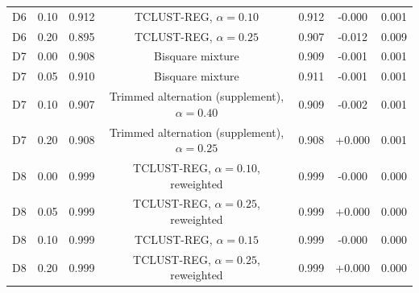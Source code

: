 \begin{table}[htbp]
\begin{tabular}{llcclcc}
D6 & 0.10 & 0.912 & TCLUST-REG, $\alpha=0.10$ & 0.912 & -0.000 & 0.001 \\
D6 & 0.20 & 0.895 & TCLUST-REG, $\alpha=0.25$ & 0.907 & -0.012 & 0.009 \\
D7 & 0.00 & 0.908 & Bisquare mixture & 0.909 & -0.001 & 0.001 \\
D7 & 0.05 & 0.910 & Bisquare mixture & 0.911 & -0.001 & 0.001 \\
D7 & 0.10 & 0.907 & Trimmed alternation (supplement), $\alpha=0.40$ & 0.909 & -0.002 & 0.001 \\
D7 & 0.20 & 0.908 & Trimmed alternation (supplement), $\alpha=0.25$ & 0.908 & +0.000 & 0.001 \\
D8 & 0.00 & 0.999 & TCLUST-REG, $\alpha=0.10$, reweighted & 0.999 & -0.000 & 0.000 \\
D8 & 0.05 & 0.999 & TCLUST-REG, $\alpha=0.25$, reweighted & 0.999 & +0.000 & 0.000 \\
D8 & 0.10 & 0.999 & TCLUST-REG, $\alpha=0.15$ & 0.999 & -0.000 & 0.000 \\
D8 & 0.20 & 0.999 & TCLUST-REG, $\alpha=0.25$, reweighted & 0.999 & +0.000 & 0.000 \\
\bottomrule
\end{tabular}
\end{table}